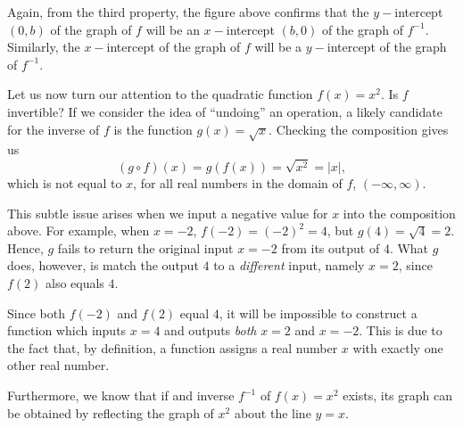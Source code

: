 \documentclass[12pt]{book}
\theoremstyle{definition}
\begin{document}
Again, from the third property, the figure above confirms that the $y-$intercept $(0,b)$ of the graph of $f$ will be an $x-$intercept $(b,0)$ of the graph of $f^{-1}$.  Similarly, the $x-$intercept of the graph of $f$ will be a $y-$intercept of the graph of $f^{-1}$.\par
Let us now turn our attention to the quadratic function $f(x) = x^2$.  Is $f$ invertible?  If we consider the idea of ``undoing'' an operation, a likely candidate for the inverse of $f$ is the function $g(x) = \sqrt{x}$.  Checking the composition gives us
$$(g\circ f)(x) = g(f(x)) = \sqrt{x^2} = |x|,$$
which is not equal to $x$, for all real numbers in the domain of $f$, $(-\infty, \infty)$.\par
This subtle issue arises when we input a negative value for $x$ into the composition above.  For example, when $x=-2$,  $f(-2)= (-2)^2 = 4$, but $g(4) = \sqrt{4}=2$.  Hence, $g$ fails to return the original input $x=-2$ from its output of $4$.  What $g$ does, however, is match the output $4$ to a {\it different} input, namely $x=2$, since $f(2)$ also equals $4$.\par
Since both $f(-2)$ and $f(2)$ equal $4$, it will be impossible to construct a function which inputs $x=4$ and outputs {\it both} $x=2$ and $x=-2$.  This is due to the fact that, by definition, a function assigns a real number $x$ with exactly one other real number.\par
Furthermore, we know that if and inverse $f^{-1}$ of $f(x)=x^2$ exists, its graph can be obtained by reflecting the graph of $x^2$ about the line $y=x$.
\begin{center}
\end{center}
\end{document}
